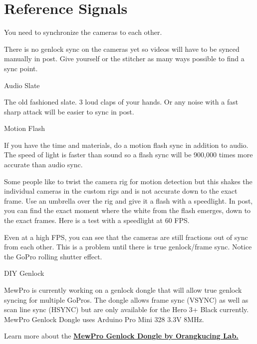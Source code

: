 \section{Reference Signals}
\pagecolor{white}
\label{chap:22}
\begin{fullwidth}

\problem

{\large You need to synchronize the cameras to each other. \par}

There is no genlock sync on the cameras yet so videos will have to be synced manually in post. Give yourself or the stitcher as many ways possible to find a sync point. 

\solution

{\large Audio Slate \par}

The old fashioned slate. 3 loud claps of your hands. Or any noise with a fast sharp attack will be easier to sync in post. 

{\large Motion Flash \par}

If you have the time and materials, do a motion flash sync in addition to audio. The speed of light is faster than sound so a flash sync will be 900,000 times more accurate than audio sync. 

Some people like to twist the camera rig for motion detection but this shakes the individual cameras in the custom rigs and is not accurate down to the exact frame. 
Use an umbrella over the rig and give it a flash with a speedlight. In post, you can find the exact moment where the white from the flash emerges, down to the exact frames. 
\clearpage
Here is a test with a speedlight at 60 FPS. 


Even at a high FPS, you can see that the cameras are still fractions out of sync from each other. This is a problem until there is true genlock/frame sync. Notice the GoPro rolling shutter effect. 

{\large DIY Genlock \par}

MewPro is currently working on a genlock dongle that will allow true genlock syncing for multiple GoPros. The dongle allows frame sync (VSYNC) as well as scan line sync (HSYNC) but are only available for the Hero 3+ Black currently. MewPro Genlock Dongle uses Arduino Pro Mini 328 3.3V 8MHz.

Learn more about the \textbf{\href{http://mewpro.cc/2015/03/20/how-to-use-mewpro-genlock-dongle/}{MewPro Genlock Dongle by Orangkucing Lab.}}


\clearpage
\end{fullwidth}
